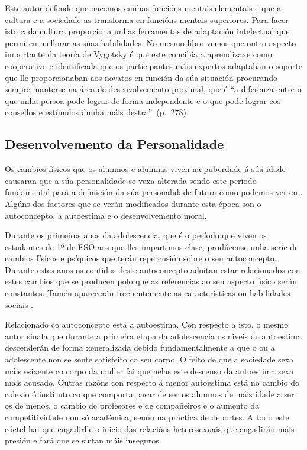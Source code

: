 Este autor defende que nacemos cunhas funcións mentais elementais e que a cultura e a sociedade as transforma en funcións mentais superiores. Para facer isto cada cultura proporciona unhas ferramentas de adaptación intelectual que permiten mellorar as súas habilidades. No mesmo libro vemos que outro aspecto importante da teoría de Vygotsky é que este concibía a aprendizaxe como cooperativo e identificada que os participantes máis expertos adaptaban o soporte que lle proporcionaban aos novatos en función da súa situación procurando sempre manterse na área de desenvolvemento proximal, que é ``a diferenza entre o que unha persoa pode lograr de forma independente e o que pode lograr cos consellos e estímulos dunha máis destra''~(p.~278).

\subsection{Desenvolvemento da Personalidade}
Os cambios físicos que os alumnos e alumnas viven na puberdade á súa idade causaran que a súa personalidade se vexa alterada sendo este período fundamental para a definición da súa personalidade futura como podemos ver en . Algúns dos factores que se verán modificados durante esta época son o autoconcepto, a autoestima
 e o desenvolvemento moral.

Durante os primeiros anos da adolescencia, que é o período que viven os estudantes de 1º de ESO aos que lles impartimos clase, prodúcense unha serie de cambios físicos e psíquicos que terán repercusión sobre o seu autoconcepto. Durante estes anos os contidos deste autoconcepto adoitan estar relacionados con estes cambios que se producen polo que as referencias ao seu aspecto físico serán constantes. Tamén aparecerán frecuentemente as características ou habilidades sociais \cite{personalidadcoll}.

Relacionado co autoconcepto está a autoestima. Con respecto a isto, o mesmo autor sinala que durante a primeira etapa da adolescencia os niveis de autoestima descenderán de forma xeneralizada debido fundamentalmente a que o ou a adolescente non se sente satisfeito co seu corpo. O feito de que a sociedade sexa máis esixente co corpo da muller fai que nelas este descenso da autoestima sexa máis acusado. Outras razóns con respecto á menor autoestima está no cambio do colexio ó instituto co que comporta pasar de ser os alumnos de máis idade a ser os de menos, o cambio de profesores e de compañeiros e o aumento da competitividade non só académica, senón na práctica de deportes. A todo este cóctel hai que engadirlle o inicio das relacións heterosexuais que engadirán máis presión e fará que se sintan máis inseguros.

